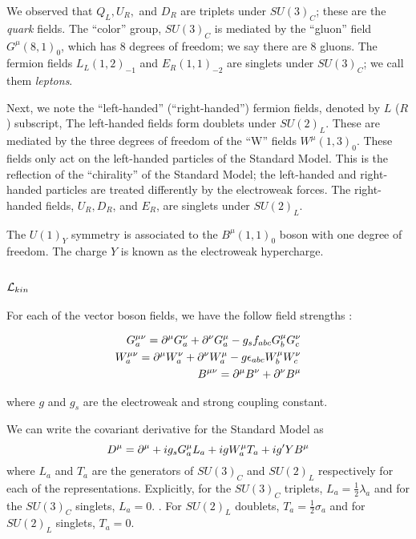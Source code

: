 We observed that $Q_L, U_R,$ and $D_R$ are triplets under $SU(3)_C$; these are the \textit{quark} fields.
The ``color'' group, $SU(3)_C$ is mediated by the ``gluon'' field $G^\mu(8,1)_0$, which has 8 degrees of freedom; we say there are 8 gluons.
The fermion fields $L_L(1,2)_{-1}$ and $  E_R(1,1)_{-2} $ are singlets under $SU(3)_C$; we call them \textit{leptons}.

Next, we note the ``left-handed'' (``right-handed'') fermion fields, denoted by $L$ ($R$) subscript,
The left-handed fields form doublets under $SU(2)_L$.
These are mediated by the three degrees of freedom of the  ``W'' fields $W^\mu(1,3)_0$.
These fields only act on the left-handed particles of the Standard Model.
This is the reflection of the ``chirality'' of the Standard Model; the left-handed and right-handed particles are treated differently by the electroweak forces.
The right-handed fields, $U_R, D_R$, and $E_R$, are singlets under $SU(2)_L$.

The $U(1)_Y$ symmetry is associated to the $B^\mu(1,1)_0$ boson with one degree of freedom.
The charge $Y$ is known as the electroweak hypercharge.

\subsection{$\mathcal{L}_{kin}$}

For each of the vector boson fields, we have the follow field strengths :

\begin{equation}
\begin{aligned}
G^{\mu\nu}_a = \partial^\mu G^\nu_a + \partial^\nu G^\mu_a - g_s f_{abc} G^\mu_b G^\nu_c \\
W^{\mu\nu}_a = \partial^\mu W^\nu_a + \partial^\nu W^\mu_a - g \epsilon_{abc} W_b^\mu W_c^\nu \\
B^{\mu\nu}   = \partial^\mu B^\nu   + \partial^\nu B^\mu
\end{aligned}
\end{equation}

where $g$ and $g_s$ are the electroweak and strong coupling constant.

We can write the covariant derivative for the Standard Model as
\begin{equation}
D^\mu = \partial^\mu + ig_s G^\mu_a L_a + i g W^\mu_a T_a + i g' Y B^\mu
\end{equation}
where $L_a$ and $T_a$ are the generators of $SU(3)_C $ and $SU(2)_L$ respectively for each of the representations.
Explicitly, for the $SU(3)_C$ triplets, $L_a = \frac{1}{2} \lambda_a$ and for the $SU(3)_C$ singlets, $L_a = 0$. .
For $SU(2)_L$ doublets, $T_a = \frac{1}{2} \sigma_a $ and for $SU(2)_L$ singlets, $T_a = 0$.

